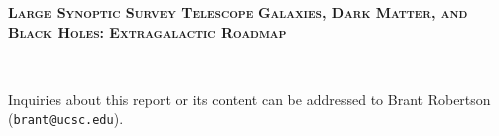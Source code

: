 \documentclass[11pt,fleqn]{book} %
\begin{document}

\begingroup
{\Huge\bfseries\scshape Large Synoptic Survey Telescope} 
\linebreak 
\linebreak 
{\Huge\bfseries\scshape Galaxies, Dark Matter, and Black Holes: Extragalactic Roadmap} 


\vfill
\endgroup

\newpage
\thispagestyle{empty}
\noindent
\noindent
\noindent
\\
\noindent

Inquiries about this report or its content can be addressed to Brant Robertson ({\tt brant@ucsc.edu}).





\end{document}
